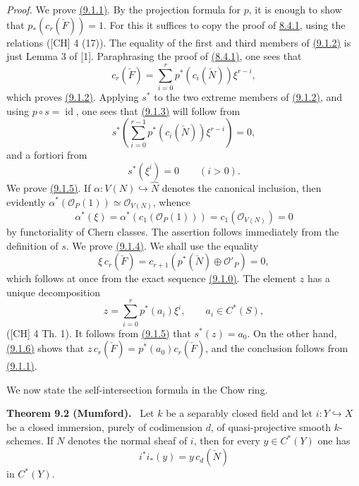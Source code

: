 \documentclass[11pt]{article}
\newenvironment{statement}[1]{\par\medskip\noindent\textbf{#1.}\ }{\par\medskip}
\begin{document}
\emph{Proof.} We prove \hyperref[sga5:VII:equation:9.1.1]{(9.1.1)}. By the projection formula for $p$, it is enough to show that $p_*(c_r(\check F))=1$. For this it suffices to copy the proof of \hyperref[sga5:VII:lemma:8.4.1]{8.4.1}, using the relations ([CH] 4 (17)). The equality of the first and third members of \hyperref[sga5:VII:equation:9.1.2]{(9.1.2)} is just Lemma 3 of [1]. Paraphrasing the proof of \hyperref[sga5:VII:lemma:8.4.1]{(8.4.1)}, one sees that
\[
c_r(\check F)=\sum_{i=0}^r p^*(c_i(\check N))\xi^{r-i},
\tag{9.1.2 bis}\label{sga5:VII:equation:9.1.2-bis}
\]
which proves \hyperref[sga5:VII:equation:9.1.2]{(9.1.2)}. Applying $s^*$ to the two extreme members of \hyperref[sga5:VII:equation:9.1.2]{(9.1.2)}, and using $p\circ s=\operatorname{id}$, one sees that \hyperref[sga5:VII:equation:9.1.3]{(9.1.3)} will follow from
\[
s^*\left(\sum_{i=0}^{r-1}p^*(c_i(\check N))\xi^{r-i}\right)=0,
\]
and a fortiori from
\[
s^*(\xi^i)=0\qquad(i>0).
\tag{9.1.5}\label{sga5:VII:equation:9.1.5}
\]
We prove \hyperref[sga5:VII:equation:9.1.5]{(9.1.5)}. If $\alpha:V(N)\hookrightarrow\widehat N$ denotes the canonical inclusion, then evidently $\alpha^*(\mathcal O_P(1))\simeq\mathcal O_{V(N)}$, whence
\[
\alpha^*(\xi)=\alpha^*(c_1(\mathcal O_P(1)))=c_1(\mathcal O_{V(N)})=0
\]
by functoriality of Chern classes. The assertion follows immediately from the definition of $s$. We prove \hyperref[sga5:VII:equation:9.1.4]{(9.1.4)}. We shall use the equality
\[
\xi\,c_r(\check F)=c_{r+1}(p^*(\check N)\oplus\mathcal O'_P)=0,
\tag{9.1.6}\label{sga5:VII:equation:9.1.6}
\]
which follows at once from the exact sequence \hyperref[sga5:VII:equation:9.1.0]{(9.1.0)}. The element $z$ has a unique decomposition
\[
z=\sum_{i=0}^r p^*(a_i)\xi^i,\qquad a_i\in C^*(S),
\]
([CH] 4 Th. 1). It follows from \hyperref[sga5:VII:equation:9.1.5]{(9.1.5)} that $s^*(z)=a_0$. On the other hand, \hyperref[sga5:VII:equation:9.1.6]{(9.1.6)} shows that $z\,c_r(\check F)=p^*(a_0)c_r(\check F)$, and the conclusion follows from \hyperref[sga5:VII:equation:9.1.1]{(9.1.1)}.

We now state the self-intersection formula in the Chow ring.

\label{sga5:VII:theorem:9.2}\begin{statement}{Theorem 9.2 (Mumford)}
Let $k$ be a separably closed field and let $i:Y\hookrightarrow X$ be a closed immersion, purely of codimension $d$, of quasi-projective smooth $k$-schemes. If $N$ denotes the normal sheaf of $i$, then for every $y\in C^*(Y)$ one has
\[
i^*i_*(y)=y\,c_d(\check N)
\]
in $C^*(Y)$.
\end{statement}
\end{document}
